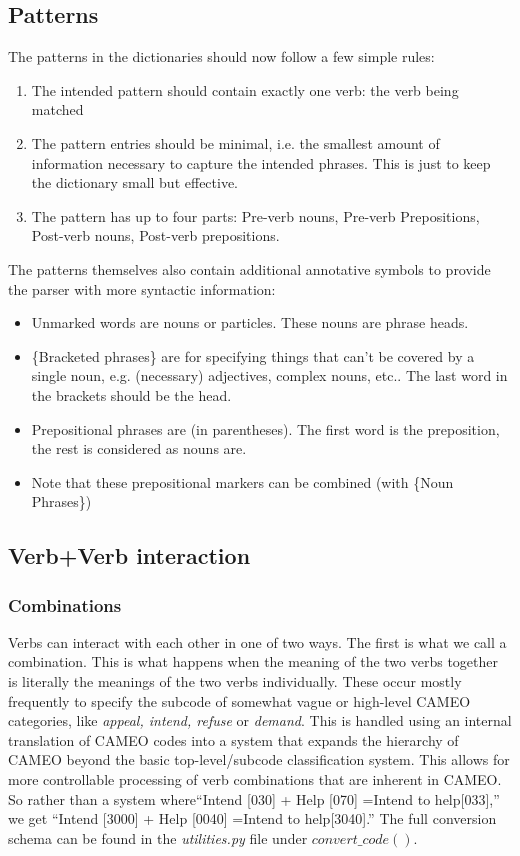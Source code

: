 \documentclass[11pt]{article}
\begin{document}
\subsection{Patterns}
The patterns in the dictionaries should now follow a few simple rules:
\begin{enumerate}
  \item The intended pattern should contain exactly one verb: the verb being 
  matched
  \item The pattern entries should be minimal, i.e. the smallest 
  amount of information necessary to capture the intended phrases. This is just 
  to keep the dictionary small but effective.
  \item The pattern has up to four parts: Pre-verb nouns, Pre-verb Prepositions,
  Post-verb nouns, Post-verb prepositions. 
\end{enumerate}
The patterns themselves also contain additional annotative symbols to provide 
the parser with more syntactic information:
\begin{itemize}
  \item Unmarked words are nouns or particles. These nouns are phrase heads.
  \item \{Bracketed phrases\} are for specifying things that can't be covered by 
  a single noun, e.g. (necessary) adjectives, complex nouns, etc.. The last word in the brackets should be the head. 
  \item Prepositional phrases are (in parentheses). The first word is the 
  preposition, the rest is considered as nouns are.
  \item Note that these prepositional markers can be combined (with \{Noun Phrases\})
\end{itemize}
\subsection{Verb+Verb interaction}
\subsubsection{Combinations}
Verbs can interact with each other in one of two ways. The first is what we 
call a combination. This is what happens when the meaning of the two verbs 
together is literally the meanings of the two verbs individually. These occur 
mostly frequently to specify the subcode of somewhat vague or high-level 
CAMEO categories, like \textit{appeal, intend, refuse} or \textit{demand}.
This is handled using an internal translation of CAMEO codes into a system that
expands the hierarchy of CAMEO beyond the basic top-level/subcode classification
system. This allows for more controllable processing of verb combinations that 
are inherent in CAMEO. So rather than a system where``Intend [030] + Help [070] =Intend to help[033],''
we get ``Intend [3000] + Help [0040] =Intend to help[3040].'' The full 
conversion schema can be found in the \textit{utilities.py} file under 
$convert\_code()$. 
\end{document}
